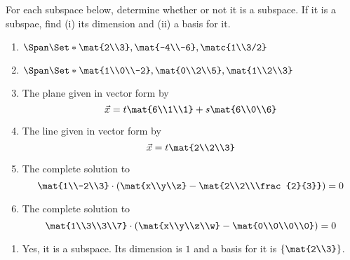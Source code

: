 \begin{exercises}
\begin{problist}
		\prob For each subspace below, determine whether or not it is a subspace.
		If it is a subspae, find (i) its dimension and (ii) a basis for it.
		\begin{enumerate}
			\item $\Span\Set*{\mat{2\\3}, \mat{-4\\-6}, \matc{1\\3/2}}$
			\item $\Span\Set*{\mat{1\\0\\-2}, \mat{0\\2\\5}, \mat{1\\2\\3}}$
			\item The plane given in vector form by
			\[
				\vec x = t\mat{6\\1\\1}+s\mat{6\\0\\6}
			\]
			\item The line given in vector form by
			\[
				\vec x = t\mat{2\\2\\3}
			\]
			\item The complete solution to
			\[
				\mat{1\\-2\\3} \cdot \left(\mat{x\\y\\z}-\mat{2\\2\\\frac{2}{3}}\right)=0
			\]
			\item The complete solution to
			\[
				\mat{1\\3\\3\\7} \cdot \left(\mat{x\\y\\z\\w}-\mat{0\\0\\0\\0}\right)=0
			\]
		\end{enumerate}
		\begin{solution}
			\begin{enumerate}
				\item Yes, it is a subspace. Its dimension is $1$ and a basis for it is $\left\{\mat{2\\3}\right\}$.


\end{enumerate}
\end{solution}
\end{problist}
\end{exercises}
